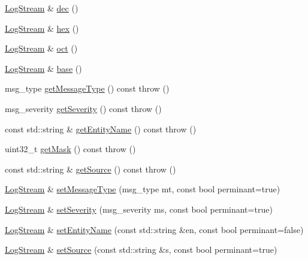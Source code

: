 \begin{DoxyCompactItemize}
\item 
\hyperlink{classkisscpp_1_1_log_stream}{Log\-Stream} \& \hyperlink{classkisscpp_1_1_log_stream_a8ed923f031fb6fd9c981d8c694c16a92}{dec} ()
\item 
\hyperlink{classkisscpp_1_1_log_stream}{Log\-Stream} \& \hyperlink{classkisscpp_1_1_log_stream_afdfaf9b54bf9ab3f95613fff8fe493a1}{hex} ()
\item 
\hyperlink{classkisscpp_1_1_log_stream}{Log\-Stream} \& \hyperlink{classkisscpp_1_1_log_stream_ab8f40d07bbf5dccf2a6c2033405dd2be}{oct} ()
\item 
\hyperlink{classkisscpp_1_1_log_stream}{Log\-Stream} \& \hyperlink{classkisscpp_1_1_log_stream_a857e9c930544fe22317b9be6a7d0d9ce}{base} ()
\item 
msg\-\_\-type \hyperlink{classkisscpp_1_1_log_stream_a794d4a886b632e9892509e9756dd5b8f}{get\-Message\-Type} () const   throw ()
\item 
msg\-\_\-severity \hyperlink{classkisscpp_1_1_log_stream_aa8cec98e4f43e52f8ace044e61f90dec}{get\-Severity} () const   throw ()
\item 
const std\-::string \& \hyperlink{classkisscpp_1_1_log_stream_a37cf1aef25583d4544d149d5f2c7abe6}{get\-Entity\-Name} () const   throw ()
\item 
uint32\-\_\-t \hyperlink{classkisscpp_1_1_log_stream_a0c7407111930ad9eb1249478b788f4dc}{get\-Mask} () const   throw ()
\item 
const std\-::string \& \hyperlink{classkisscpp_1_1_log_stream_a9c62fef30deb7557b7920580ab4a389a}{get\-Source} () const   throw ()
\item 
\hyperlink{classkisscpp_1_1_log_stream}{Log\-Stream} \& \hyperlink{classkisscpp_1_1_log_stream_ad878a5863435605edaa35ee254f7702c}{set\-Message\-Type} (msg\-\_\-type mt, const bool perminant=true)
\item 
\hyperlink{classkisscpp_1_1_log_stream}{Log\-Stream} \& \hyperlink{classkisscpp_1_1_log_stream_a5a2f4fb927e1162065847fa64f9c2662}{set\-Severity} (msg\-\_\-severity ms, const bool perminant=true)
\item 
\hyperlink{classkisscpp_1_1_log_stream}{Log\-Stream} \& \hyperlink{classkisscpp_1_1_log_stream_adaf27d5069674b2e934883c107187686}{set\-Entity\-Name} (const std\-::string \&en, const bool perminant=false)
\item 
\hyperlink{classkisscpp_1_1_log_stream}{Log\-Stream} \& \hyperlink{classkisscpp_1_1_log_stream_adcc3d0579fa1a4bcf6649274792b27e0}{set\-Source} (const std\-::string \&s, const bool perminant=true)
\item 

\end{DoxyCompactItemize}
